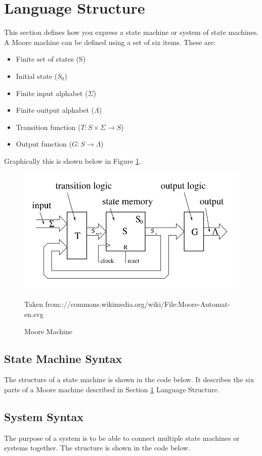 \section{Language Structure}
\label{sec:LanguageStructure}
This section defines how you express a state machine or system of state
machines. A Moore machine can be defined using a set of six items. These are:

\begin{itemize}
   \item Finite set of states (S)
   \item Initial state ($S_0$)
   \item Finite input alphabet ($\Sigma$)
   \item Finite ouitput alphabet ($\Lambda$)
   \item Transition function ($T:S\times\Sigma\rightarrow S$)
   \item Output function ($G:S \rightarrow \Lambda$)
\end{itemize}

Graphically this is shown below in Figure \ref{fig:MooreMachine}.

\begin{figure}[h]
   \centering
   \includegraphics[scale=0.4]{MooreMachine}
   \caption{Moore Machine}
   \small{Taken from:://commons.wikimedia.org/wiki/File:Moore-Automat-en.svg}
   \label{fig:MooreMachine}
\end{figure}
\FloatBarrier

\subsection{State Machine Syntax}
The structure of a state machine is shown in the code below. It describes the
six parts of a Moore machine described in Section \ref{sec:LanguageStructure}
Language Structure.



\subsection{System Syntax}
The purpose of a system is to be able to connect multiple state machines or
systems together. The structure is shown in the code below.


